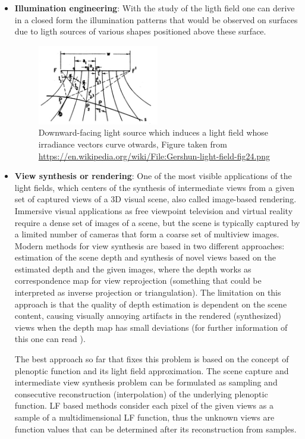 \begin{itemize}
\item \textbf{Illumination engineering}: With the study of the ligth field one can derive in a closed form the illumination patterns that would be observed on surfaces due to ligth sources of various shapes positioned above these surface. 
\begin{figure}[h!]
\centering
\includegraphics[width= 0.50\textwidth]{./Diagrams/ill_enge.png}
\caption{Downward-facing light source which induces a light field whose irradiance vectors curve otwards, Figure taken from \url{https://en.wikipedia.org/wiki/File:Gershun-light-field-fig24.png}}
\end{figure}

\item \textbf{View synthesis or rendering}: One of the most visible applications of the light fields, which centers of the synthesis of intermediate views from a given set of captured views of a 3D visual scene, also called image-based rendering. Immersive visual applications as free viewpoint television and virtual reality require a dense set of images of a scene, but the scene is typically captured by a limited number of cameras that form a coarse set of multiview images. Modern methods for view synthesis are based in two different approaches: estimation of the scene depth and synthesis of novel views based on the estimated depth and the given images, where the depth works as correspondence map for view reprojection (something that could be interpreted as inverse projection or triangulation). The limitation on this approach is that the quality of depth estimation is dependent on the scene content, causing visually annoying artifacts in the rendered (synthesized) views when the depth map has small deviations (for further information of this one can read \cite{Kim-Zimmer}).

\bigskip

The best approach so far that fixes this problem is based on the concept of plenoptic function and its light field  approximation. The scene capture and intermediate view synthesis problem can be formulated as sampling and consecutive reconstruction (interpolation) of the underlying plenoptic function. LF based methods consider each pixel of the given views as a sample of a multidimensional LF function, thus the unknown views are function values that can be determined after its reconstruction from samples.


\end{itemize}
